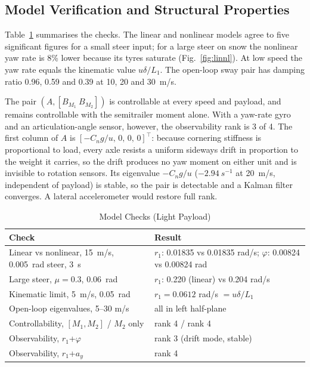 \documentclass[conference]{IEEEtran}
\begin{document}
\subsection{Model Verification and Structural Properties}
Table~\ref{tab:checks} summarises the checks. The linear and nonlinear models agree to five significant figures for a small steer input; for a large steer on snow the nonlinear yaw rate is 8\% lower because its tyres saturate (Fig.~\ref{fig:linnl}). At low speed the yaw rate equals the kinematic value $u\delta/L_1$. The open-loop sway pair has damping ratio 0.96, 0.59 and 0.39 at 10, 20 and \SI{30}{m/s}.

The pair $(A,[B_{M_1}\ B_{M_2}])$ is controllable at every speed and payload, and remains controllable with the semitrailer moment alone. With a yaw-rate gyro and an articulation-angle sensor, however, the observability rank is 3 of 4. The first column of $A$ is $[-C_ng/u,\,0,\,0,\,0]^\top$: because cornering stiffness is proportional to load, every axle resists a uniform sideways drift in proportion to the weight it carries, so the drift produces no yaw moment on either unit and is invisible to rotation sensors. Its eigenvalue $-C_ng/u$ ($\SI{-2.94}{s^{-1}}$ at \SI{20}{m/s}, independent of payload) is stable, so the pair is detectable and a Kalman filter converges. A lateral accelerometer would restore full rank.

\begin{table}[t]
\caption{Model Checks (Light Payload)}
\label{tab:checks}
\centering
\begin{tabular}{@{}p{3.9cm}p{4.0cm}@{}}
\toprule
Check & Result\\
\midrule
Linear vs nonlinear, \SI{15}{m/s}, \SI{0.005}{rad} steer, \SI{3}{s} & $r_1$: 0.01835 vs 0.01835 rad/s; $\varphi$: 0.00824 vs 0.00824 rad\\
Large steer, $\mu=0.3$, \SI{0.06}{rad} & $r_1$: 0.220 (linear) vs 0.204 rad/s\\
Kinematic limit, \SI{5}{m/s}, \SI{0.05}{rad} & $r_1=0.0612$ rad/s $=u\delta/L_1$\\
Open-loop eigenvalues, 5--30 m/s & all in left half-plane\\
Controllability, $[M_1,M_2]$ / $M_2$ only & rank 4 / rank 4\\
Observability, $r_1$+$\varphi$ & rank 3 (drift mode, stable)\\
Observability, $r_1$+$a_y$ & rank 4\\
\bottomrule
\end{tabular}
\end{table}
\end{document}
